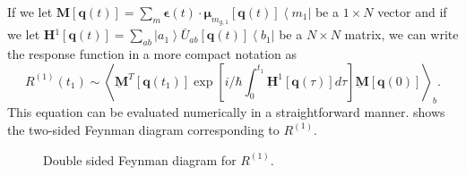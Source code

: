 \documentclass{article}
\newcommand{\bra}[1]{\ensuremath{\left\langle#1\right|}}
\newcommand{\ket}[1]{\ensuremath{\left|#1\right\rangle}}
\newcommand{\vect}[1]{\ensuremath{\boldsymbol{\mathbf{#1}}}}
\newcommand{\arw}{-{Latex[length=2mm]}}
\begin{document}
If we let \underline{$\vect M$}$[\vect q(t)]=\sum_{m}\vect\epsilon(t)\cdot \vect\mu_{m_{g,1}}[\vect q(t)] \bra{m_{1}}$ be a $1\times N$ vector and if we let \underline{$\vect H$}$^{1}[\vect q(t)]=\sum_{ab}\ket{a_{1}}\bar U_{ab}[\vect q(t)]\bra{b_{1}}$ be a $N\times N$ matrix, we can write the response function in a more compact notation as
\begin{equation}
R^{(1)}(t_{1})\sim\left\langle \underbar{\vect{M}}^{T}[\vect q(t_{1})]\exp\left[i/\hbar\int_{0}^{t_{1}}\underbar{\vect{H}}^{1}[\vect q(\tau)]d\tau\right] \underbar{\vect{M}} [\vect q(0)] \right\rangle_{b}.
\end{equation}
This equation can be evaluated numerically in a straightforward manner.
 shows the two-sided Feynman diagram corresponding to $R^{(1)}$.

\begin{figure}
\centering
{}
\caption{Double sided Feynman diagram for $R^{(1)}$.}\label{fig:fd1}
\end{figure}
\end{document}
